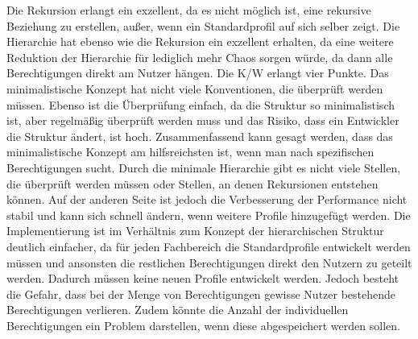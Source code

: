 Die Rekursion erlangt ein exzellent, da es nicht möglich ist, eine rekursive Beziehung zu erstellen, außer, wenn ein Standardprofil auf sich selber zeigt.
Die Hierarchie hat ebenso wie die Rekursion ein exzellent erhalten, da eine weitere Reduktion der Hierarchie für lediglich mehr Chaos sorgen würde, da dann alle Berechtigungen direkt am Nutzer hängen.
Die \ac{K/W} erlangt vier Punkte. 
Das minimalistische Konzept hat nicht viele Konventionen, die überprüft werden müssen.
Ebenso ist die Überprüfung einfach, da die Struktur so minimalistisch ist, aber regelmäßig überprüft werden muss und das Risiko, dass ein Entwickler die Struktur ändert, ist hoch.
\newline
\newline
Zusammenfassend kann gesagt werden, dass das minimalistische Konzept am hilfsreichsten ist, wenn man nach spezifischen Berechtigungen sucht.
Durch die minimale Hierarchie gibt es nicht viele Stellen, die überprüft werden müssen oder Stellen, an denen Rekursionen entstehen können.
Auf der anderen Seite ist jedoch die Verbesserung der Performance nicht stabil und kann sich schnell ändern, wenn weitere Profile hinzugefügt werden.
Die Implementierung ist im Verhältnis zum Konzept der hierarchischen Struktur deutlich einfacher, da für jeden Fachbereich die Standardprofile entwickelt werden müssen und ansonsten die restlichen Berechtigungen direkt den Nutzern zu geteilt werden. Dadurch müssen keine neuen Profile entwickelt werden.
Jedoch besteht die Gefahr, dass bei der Menge von Berechtigungen gewisse Nutzer bestehende Berechtigungen verlieren.
Zudem könnte die Anzahl der individuellen Berechtigungen ein Problem darstellen, wenn diese abgespeichert werden sollen.

